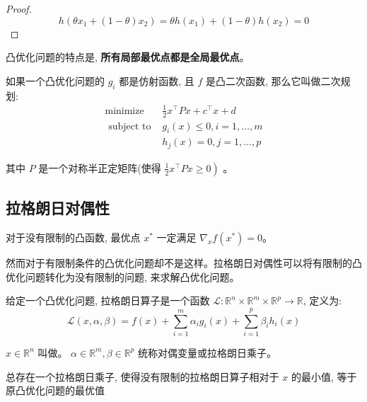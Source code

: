 \begin{proof}
    $$ h\left(\theta x_{1}+(1-\theta) x_{2}\right)=\theta h\left(x_{1}\right)+(1-\theta) h\left(x_{2}\right)=0 $$
\end{proof}

凸优化问题的特点是, \textbf{所有局部最优点都是全局最优点}。

\begin{definition}[二次规划]
    如果一个凸优化问题的 $ g_{i} $ 都是仿射函数, 且 $ f $ 是凸二次函数, 那么它叫做二次规划:
    $$
    \begin{array}{ll}
    \operatorname{minimize} & \frac{1}{2} x^{\top} P x+c^{\top} x+d \\
    \text { subject to } & g_{i}(x) \leqslant 0, i=1, \ldots, m \\
    & h_{j}(x)=0, j=1, \ldots, p
    \end{array}
    $$

    其中 $ P $ 是一个对称半正定矩阵(使得 $ \left.\frac{1}{2} x^{\top} P x \geqslant 0\right) $ 。
\end{definition}



\subsection{拉格朗日对偶性}

\begin{theorem}
    对于没有限制的凸函数, 最优点 $ x^{*} $ 一定满足 $ \nabla_{x} f\left(x^{*}\right)=0 $。
\end{theorem}

然而对于有限制条件的凸优化问题却不是这样。拉格朗日对偶性可以将有限制的凸优化问题转化为没有限制的问题, 来求解凸优化问题。

\begin{definition}[拉格朗日函数]
    给定一个凸优化问题, 拉格朗日算子是一个函数 $ \mathcal{L}: \mathbb{R}^{n} \times \mathbb{R}^{m} \times \mathbb{R}^{p} \rightarrow \mathbb{R} $, 定义为:
    $$
    \mathcal{L}(x, \alpha, \beta)=f(x)+\sum_{i=1}^{m} \alpha_{i} g_{i}(x)+\sum_{i=1}^{p} \beta_{i} h_{i}(x)
    $$

    $ x \in \mathbb{R}^{n} $ 叫做。 $ \alpha \in \mathbb{R}^{m}, \beta \in \mathbb{R}^{p} $ 统称对偶变量或拉格朗日乘子。
\end{definition}

\begin{theorem}
    总存在一个拉格朗日乘子, 使得没有限制的拉格朗日算子相对于 $ x $ 的最小值, 等于原凸优化问题的最优值
\end{theorem}

